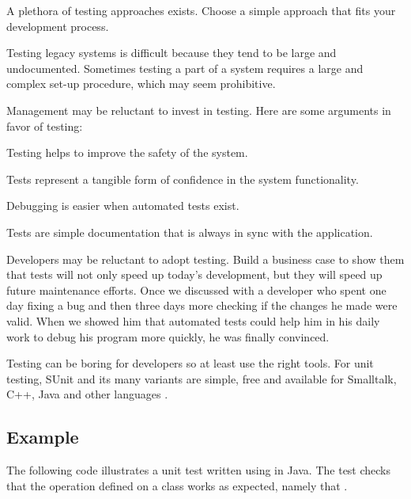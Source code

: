\documentclass[a4paper,10pt,twoside]{book}
\begin{document}
\begin{bulletlist}
\item A plethora of testing approaches exists. Choose a simple approach that fits your development process.
\item Testing legacy systems is difficult because they tend to be large and undocumented. Sometimes testing a part of a system requires a large and complex set-up procedure, which may seem prohibitive.
\item Management may be reluctant to invest in testing. Here are some arguments in favor of testing: 

\begin{bulletlist}
\item Testing helps to improve the safety of the system. 

\item Tests represent a tangible form of confidence in the system functionality.

\item Debugging is easier when automated tests exist.

\item Tests are simple documentation that is always in sync with the application. 
\end{bulletlist}

\item Developers may be reluctant to adopt testing. Build a business case to show them that tests will not only speed up today's development, but they will speed up future maintenance efforts. Once we discussed with a developer who spent one day fixing a bug and then three days more checking if the changes he made were valid. When we showed him that automated tests could help him in his daily work to debug his program more quickly, he was finally convinced.
\item Testing can be boring for developers so at least use the right tools. For unit testing, SUnit and its many variants are simple, free and available for Smalltalk, C++, Java and other languages \cite{Beck98a}.
\end{bulletlist}

\subsection*{Example}

The following code illustrates a unit test written using  in Java\cite{Beck98a}. The test checks that the  operation defined on a class  works as expected, namely that .
\end{document}

